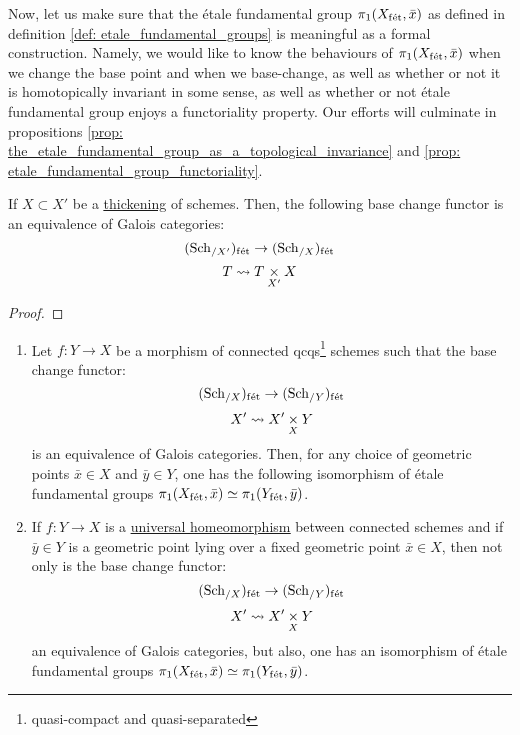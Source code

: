         Now, let us make sure that the \'etale fundamental group $\pi_1(X_{\mathrm{f\acute{e}t}}, \bar{x})$ as defined in definition \ref{def: etale_fundamental_groups} is meaningful as a formal construction. Namely, we would like to know the behaviours of $\pi_1(X_{\mathrm{f\acute{e}t}}, \bar{x})$ when we change the base point and when we base-change, as well as whether or not it is homotopically invariant in some sense, as well as whether or not \'etale fundamental group enjoys a functoriality property. Our efforts will culminate in propositions \ref{prop: the_etale_fundamental_group_as_a_topological_invariance} and \ref{prop: etale_fundamental_group_functoriality}.
        \begin{lemma} \label{lemma: base_change_of_thickenings}
            If $X \subset X'$ be a \href{https://stacks.math.columbia.edu/tag/04EW}{\underline{thickening}} of schemes. Then, the following base change functor is an equivalence of Galois categories:
                $$(\mathrm{Sch}_{/X'})_{\mathrm{f\acute{e}t}} \to (\mathrm{Sch}_{/X})_{\mathrm{f\acute{e}t}}$$
                $$T \mapsto T \x_{X'} X$$
        \end{lemma}
            \begin{proof}
                
            \end{proof}
        \begin{proposition} \label{prop: the_etale_fundamental_group_as_a_topological_invariance}
            \noindent
            \begin{enumerate}
                \item Let $f: Y \to X$ be a morphism of connected qcqs\footnote{quasi-compact and quasi-separated} schemes such that the base change functor:
                    $$(\mathrm{Sch}_{/X})_{\mathrm{f\acute{e}t}} \to (\mathrm{Sch}_{/Y})_{\mathrm{f\acute{e}t}}$$
                    $$X' \mapsto X' \x_X Y$$
                is an equivalence of Galois categories. Then, for any choice of geometric points $\bar{x} \in X$ and $\bar{y} \in Y$, one has the following isomorphism of \'etale fundamental groups $\pi_1(X_{\mathrm{f\acute{e}t}}, \bar{x}) \simeq \pi_1(Y_{\mathrm{f\acute{e}t}}, \bar{y})$.
                \item If $f: Y \to X$ is a \href{https://stacks.math.columbia.edu/tag/04DC}{\underline{universal homeomorphism}} between connected schemes and if $\bar{y} \in Y$ is a geometric point lying over a fixed geometric point $\bar{x} \in X$, then not only is the base change functor:
                    $$(\mathrm{Sch}_{/X})_{\mathrm{f\acute{e}t}} \to (\mathrm{Sch}_{/Y})_{\mathrm{f\acute{e}t}}$$
                    $$X' \mapsto X' \x_X Y$$
                an equivalence of Galois categories, but also, one has an isomorphism of \'etale fundamental groups $\pi_1(X_{\mathrm{f\acute{e}t}}, \bar{x}) \simeq \pi_1(Y_{\mathrm{f\acute{e}t}}, \bar{y})$. 
            \end{enumerate}
        \end{proposition}
